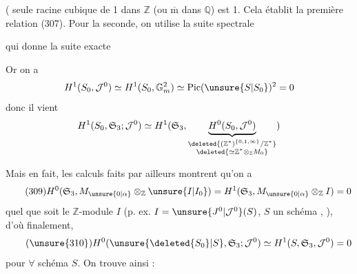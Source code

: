 ( seule racine  cubique de 1 dans $\mathbb Z$ (ou $\overline{\mathrm m}$ dans $\mathbb Q$) est 1. Cela établit la première relation (307). Pour la seconde, on utilise la suite spectrale



qui donne la suite exacte

Or on a
\[
H^1(S_0,\mathcal J^0)\simeq H^1(S_0,\mathbb G_m^2)\simeq\operatorname{Pic}(\unsure{S|S_0})^2=0
\]
donc il vient
\[
H^1(S_0,\mathfrak S_3;\mathcal J^0)\simeq H^1(\mathfrak S_3,\underbrace{H^0(S_0,\mathcal J^0)}_{\substack{\deleted{(\mathbb Z^*)^{\{0,1,\infty\}}/\mathbb Z^*}\\\deleted{\simeq\mathbb Z^*\otimes_{\mathbb Z}M_0}}})
\]

Mais en fait, les calculs faits par ailleurs montrent qu'on a
\[
\tag{309}
H^0(\mathfrak S_3,M_{\unsure{0|\alpha}}\otimes_{\mathbb Z}\unsure{I|I_0})=H^1(\mathfrak S_3,M_{\unsure{0|\alpha}}\otimes_{\mathbb Z}I)=0
\]
quel que soit le $\mathbb Z$-module $I$ (p. ex. $I=\unsure{J^0|\mathcal J^0}(S)$, $S$ un schéma , ), d'où finalement,
\[
\tag{\unsure{310}}
H^0(\unsure{\deleted{S_0}|S},\mathfrak S_3;\mathcal J^0)\simeq H^1(S,\mathfrak S_3,\mathcal J^0)=0
\]
pour $\forall$ schéma $S$. On trouve ainsi :

